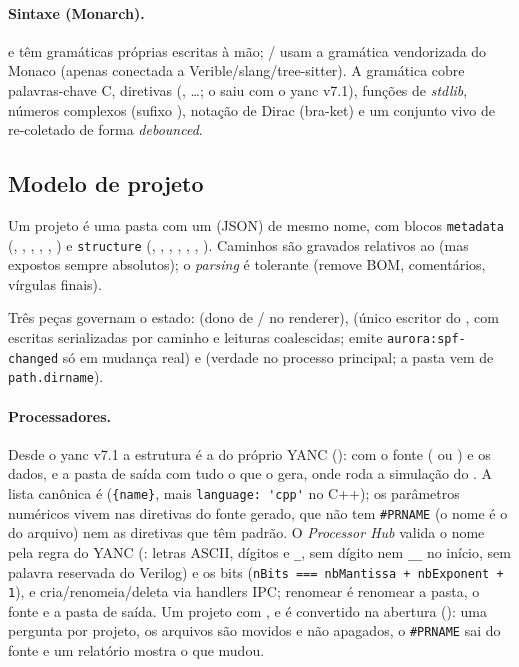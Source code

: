\paragraph{Sintaxe (Monarch).} \cmm{} e  têm gramáticas próprias
escritas à mão; / usam a gramática
vendorizada do Monaco (apenas conectada a Verible/slang/tree-sitter). A
gramática \cmm{} cobre palavras-chave C, diretivas (,
…; o  saiu com o yanc v7.1), funções de \emph{stdlib}, números complexos (sufixo
), notação de Dirac (bra-ket) e um conjunto vivo de 
re-coletado de forma \emph{debounced}.

\subsection{Modelo de projeto}
Um projeto é uma pasta com um  (JSON) de mesmo nome, com blocos
\lstinline|metadata| (, , ,
, , ) e
\lstinline|structure| (, , ,
, , ,
). Caminhos são gravados relativos ao  (mas
expostos sempre absolutos); o \emph{parsing} é tolerante (remove BOM,
comentários, vírgulas finais).

Três peças governam o estado:  (dono de
/ no renderer),  (único escritor
do , com escritas serializadas por caminho e leituras coalescidas;
emite \lstinline|aurora:spf-changed| só em mudança real) e
 (verdade no processo principal; a pasta vem
de \lstinline|path.dirname|).

\paragraph{Processadores.} Desde o yanc v7.1 a estrutura é a do próprio YANC
():  com o fonte
( ou ) e os dados, e a pasta de saída
 com tudo o que o  gera, onde roda a
simulação do . A lista canônica é 
(\lstinline|{name}|, mais \lstinline|language: 'cpp'| no C++); os parâmetros
numéricos vivem nas diretivas do fonte gerado, que não tem \lstinline|#PRNAME| (o
nome é o do arquivo) nem as diretivas que têm padrão. O \emph{Processor Hub} valida
o nome pela regra do YANC (: letras ASCII, dígitos e
\lstinline|_|, sem dígito nem \lstinline|__| no início, sem palavra reservada do
Verilog) e os bits (\lstinline|nBits === nbMantissa + nbExponent + 1|), e
cria/renomeia/deleta via handlers IPC; renomear é renomear a pasta, o fonte e a
pasta de saída. Um projeto com ,  e
 é convertido na abertura ():
uma pergunta por projeto, os arquivos são movidos e não apagados, o
\lstinline|#PRNAME| sai do fonte e um relatório mostra o que mudou.

